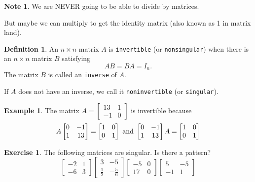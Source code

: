 \documentclass[handout]{beamer}
\newcommand{\fn}{\insertframenumber}
\theoremstyle{definition}
\newtheorem{exercise}{Exercise}
\newtheorem*{defn}{Definition}
\newtheorem*{exa}{Example}
\newtheorem*{nb}{Note}
\renewcommand{\emph}[1]{{\color{red}\texttt{#1}}}
\begin{document}
\begin{frame}{\fn}
	\begin{nb}
		We are NEVER going to be able to divide by matrices.
		
		But maybe we can multiply to get the identity matrix (also known as 1 in matrix land).
	\end{nb}
	\begin{defn}
		An $n\times n$ matrix $A$ is \emph{invertible} (or \emph{nonsingular}) when there is an $n\times n$ matrix $B$ satisfying 
			\[AB=BA=I_n.\]
		The matrix $B$ is called an \emph{inverse} of $A$.
		
		If $A$ does not have an inverse, we call it \emph{noninvertible} (or \emph{singular}).
	\end{defn}
\end{frame}
\begin{frame}{\fn}
	\begin{exa}
		The matrix $A=\begin{bmatrix}
		13&1\\-1&0
		\end{bmatrix}$ is invertible because
			\[A\begin{bmatrix}
			0&-1\\1&13
			\end{bmatrix}=
			\begin{bmatrix}
			1&0\\0&1
			\end{bmatrix}\textup{ and }
			\begin{bmatrix}
			0&-1\\1&13
			\end{bmatrix}A=
			\begin{bmatrix}
			1&0\\0&1
			\end{bmatrix}\]
	\end{exa}
	\begin{exercise}
		The following matrices are singular.  Is there a pattern?
			\[\left[\begin{array}{rr}
			-2 & 1 \\
			-6 & 3
			\end{array}\right]
			\left[\begin{array}{rr}
			3 & -5 \\
			\frac{1}{2} & -\frac{5}{6}
			\end{array}\right]
			\left[\begin{array}{rr}
			-5 & 0 \\
			17 & 0
			\end{array}\right]
			\left[\begin{array}{rr}
			5 & -5 \\
			-1 & 1
			\end{array}\right]\]
	\end{exercise}
\end{frame}
\end{document}
